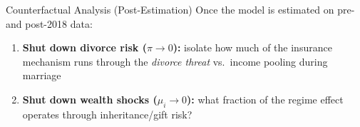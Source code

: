 \documentclass[aspectratio=169, 11pt]{beamer}
\begin{document}
\begin{frame}{Counterfactual Analysis (Post-Estimation)}
Once the model is estimated on pre- and post-2018 data:
\vspace{0.8em}
\begin{enumerate}

  \item \textbf{Shut down divorce risk ($\pi \to 0$):} isolate how much of the insurance mechanism runs through the \emph{divorce threat} vs.\ income pooling during marriage

  \vspace{0.6em}
  \item \textbf{Shut down wealth shocks ($\mu_i \to 0$):} what fraction of the regime effect operates through inheritance/gift risk?


\end{enumerate}
\end{frame}
\end{document}
